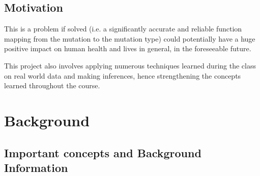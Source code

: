 \documentclass[twoside]{article}
\begin{document}
	\subsection{Motivation}
	This is a problem if solved (i.e. a significantly accurate and reliable function mapping from the mutation to the mutation type) could potentially have a huge positive impact on human health and lives in general, in the foreseeable future.
	
	This project also involves applying numerous techniques learned during the class on real world data and making inferences, hence strengthening the concepts learned throughout the course.
		
	\newpage
	
	\section{Background}
	\subsection{Important concepts and Background Information}
\end{document}
